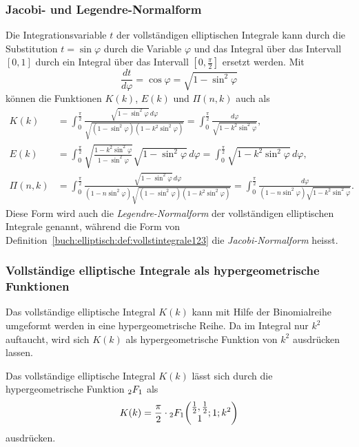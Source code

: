 \subsubsection{Jacobi- und Legendre-Normalform}
Die Integrationsvariable $t$ der vollständigen elliptischen Integrale
kann durch die Substitution $t=\sin\varphi$ durch die Variable
$\varphi$ und das Integral über das Intervall $[0,1]$ durch ein
Integral über das Intervall $[0,\frac{\pi}2]$ ersetzt werden.
Mit
\[
\frac{dt}{d\varphi} = \cos\varphi = \sqrt{1-\sin^2\varphi}
\]
können die Funktionen $K(k)$, $E(k)$ und $\Pi(n,k)$ auch als
\begin{align*}
K(k)
&=
\int_0^{\frac{\pi}2}
\frac{
\sqrt{1-\sin^2\varphi}\,d\varphi
}{
\sqrt{(1-\sin^2\varphi)(1-k^2\sin^2\varphi)}
}
=
\int_0^{\frac{\pi}2}
\frac{d\varphi}{\sqrt{1-k^2\sin^2\varphi}}
,
\\
E(k)
&=
\int_0^{\frac{\pi}2}
\sqrt{\frac{1-k^2\sin^2\varphi}{1-\sin^2\varphi}}\sqrt{1-\sin^2\varphi}\,d\varphi
=
\int_0^{\frac{\pi}2}
\sqrt{1-k^2\sin^2\varphi}\,d\varphi
,
\\
\Pi(n,k)
&=
\int_0^{\frac{\pi}2}
\frac{
\sqrt{1-\sin^2\varphi}\,d\varphi
}{
(1-n\sin^2\varphi)\sqrt{(1-\sin^2\varphi)(1-k^2\sin^2\varphi)}
}
=
\int_0^{\frac{\pi}2}
\frac{
d\varphi
}{
(1-n\sin^2\varphi)\sqrt{1-k^2\sin^2\varphi}
}
.
\end{align*}
Diese Form wird auch die {\em Legendre-Normalform} der vollständigen 
%
elliptischen Integrale genannt, während die Form von
Definition~\ref{buch:elliptisch:def:vollstintegrale123}
die {\em Jacobi-Normalform} heisst.
%

\subsubsection{Vollständige elliptische Integrale als hypergeometrische
Funktionen}
Das vollständige elliptische Integral $K(k)$ kann mit Hilfe der 
Binomialreihe umgeformt werden in eine hypergeometrische Reihe.
Da im Integral nur $k^2$ auftaucht, wird sich $K(k)$ als
hypergeometrische Funktion von $k^2$ ausdrücken lassen.

\begin{satz}
%
\label{buch:elliptisch:satz:hyperK}
Das vollständige elliptische Integral $K(k)$ lässt sich durch die
hypergeometrische Funktion $\mathstrut_2F_1$ als
\[
K(k)
=
\frac{\pi}2
\cdot
\mathstrut_2F_1\biggl(
\begin{matrix}\frac12,\frac12\\1\end{matrix};1;k^2
\biggr)
\]
ausdrücken.
\end{satz}


